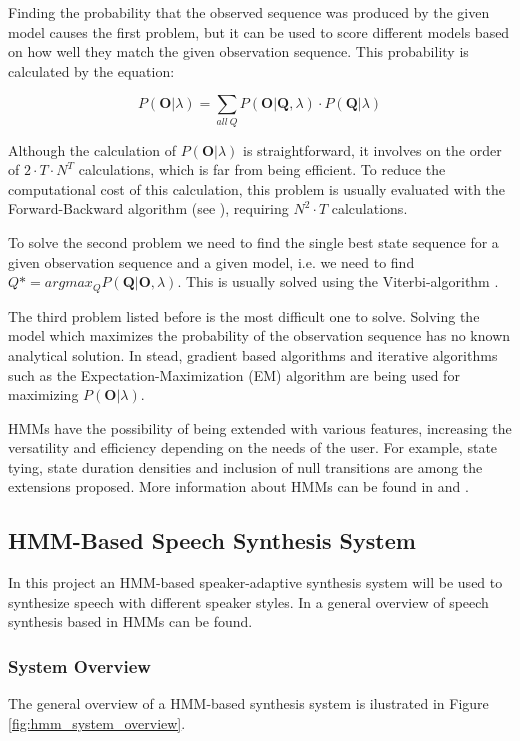 Finding the probability that the observed sequence was produced by the given model causes the first problem, but it can be used to score different models based on how well they match the given observation sequence. This probability is calculated by the equation:

\begin{equation}
P(\mathbf{O}|\lambda) = \sum_{all \ Q} P(\mathbf{O}|\mathbf{Q},\lambda) \cdot P(\mathbf{Q}|\lambda)
\end{equation}

Although the calculation of $P(\mathbf{O}|\lambda)$ is straightforward, it involves on the order of $2 \cdot T \cdot N^{T}$ calculations, which is far from being efficient.
%
To reduce the computational cost of this calculation, this problem is usually evaluated with the Forward-Backward algorithm (see \cite{rabiner89}), requiring $N^{2} \cdot T $ calculations.

To solve the second problem we need to find the single best state sequence for a given observation sequence and a given model, i.e. we need to find $Q* = arg max_{Q} P(\mathbf{Q}|\mathbf{O},\lambda)$. 
%
This is usually solved using the Viterbi-algorithm \cite{viterbi67}. 

The third problem listed before is the most difficult one to solve.
%
Solving the model which maximizes the probability of the observation sequence has no known analytical solution. 
%
In stead, gradient based algorithms and iterative algorithms such as the Expectation-Maximization (EM) algorithm \cite{dempster77} are being used for maximizing $P(\mathbf{O}|\lambda)$.

HMMs have the possibility of being extended with various features, increasing the versatility and efficiency depending on the needs of the user. 
%
For example, state tying, state duration densities and inclusion of null transitions are among the extensions proposed.
%
More information about HMMs can be found in  \cite{rabiner89} and \cite{rabiner93}.

\subsection{HMM-Based Speech Synthesis System}
\label{hmm_synthesis_based_system}
In this project an HMM-based speaker-adaptive synthesis system will be used to synthesize speech with different speaker styles.
%
In \cite{tokuda13} a general overview of speech synthesis based in HMMs can be found.

\subsubsection{System Overview}
\label{hmm_synthesis_based_system_overview}
The general overview of a HMM-based synthesis system is ilustrated in Figure \ref{fig:hmm_system_overview}.

